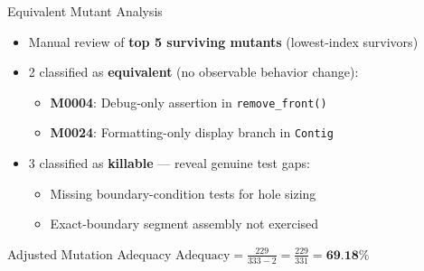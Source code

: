 \documentclass[aspectratio=169,11pt]{beamer}
\begin{document}
\begin{frame}{Equivalent Mutant Analysis}
\begin{itemize}
  \item Manual review of \textbf{top 5 surviving mutants} (lowest-index survivors)
  \item 2 classified as \textbf{equivalent} (no observable behavior change):
    \begin{itemize}\small
      \item \textbf{M0004}: Debug-only assertion in \texttt{remove\_front()}
      \item \textbf{M0024}: Formatting-only display branch in \texttt{Contig}
    \end{itemize}
  \item 3 classified as \textbf{killable} --- reveal genuine test gaps:
    \begin{itemize}\small
      \item Missing boundary-condition tests for hole sizing
      \item Exact-boundary segment assembly not exercised
    \end{itemize}
\end{itemize}
\vspace{0.3cm}
\begin{block}{Adjusted Mutation Adequacy}
\centering
$\displaystyle \text{Adequacy} = \frac{229}{333 - 2} = \frac{229}{331} = \textbf{69.18\%}$
\end{block}
\end{frame}
\end{document}
